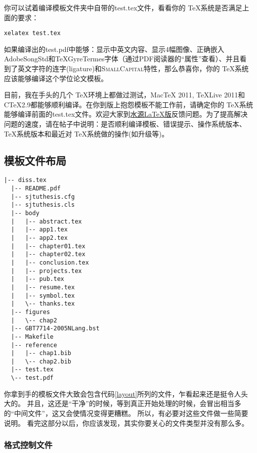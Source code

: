 你可以试着编译模板文件夹中自带的test.tex文件，看看你的 \TeX 系统是否满足上面的要求：

\begin{lstlisting}[basicstyle=\small\ttfamily, caption={编译测试文件test.tex}, numbers=none]
xelatex test.tex
\end{lstlisting}

如果编译出的test.pdf中能够：显示中英文内容、显示4幅图像、正确嵌入AdobeSongStd和TeXGyreTermes字体（通过PDF阅读器的“属性”查看）、并且看到了英文字符的连字(ligature)和\textsc{SmallCapital}特性，那么恭喜你，你的 \TeX 系统应该能够编译这个学位论文模板。

目前，我在手头的几个 \TeX 环境上都做过测试，MacTeX 2011, TeXLive 2011和C\TeX 2.9都能够顺利编译。在你到版上抱怨模板不能工作前，请确定你的 \TeX 系统能够编译前面的test.tex文件。欢迎大家到\href{https://bbs.sjtu.edu.cn/bbsdoc?board=TeX_LaTeX}{水源LaTeX版}反馈问题。为了提高解决问题的速度，请在帖子中说明：是否顺利编译模板、错误提示、操作系统版本、\TeX 系统版本和最近对 \TeX 系统做的操作(如升级等)。
 
\subsection{模板文件布局}
\label{sec:layout}

\begin{lstlisting}[basicstyle=\small\ttfamily,caption={模板文件布局},label=layout,float,numbers=none]
  |-- diss.tex
  |-- README.pdf
  |-- sjtuthesis.cfg
  |-- sjtuthesis.cls
  |-- body
  |   |-- abstract.tex
  |   |-- app1.tex
  |   |-- app2.tex
  |   |-- chapter01.tex
  |   |-- chapter02.tex
  |   |-- conclusion.tex
  |   |-- projects.tex
  |   |-- pub.tex
  |   |-- resume.tex
  |   |-- symbol.tex
  |   \-- thanks.tex
  |-- figures
  |   \-- chap2
  |-- GBT7714-2005NLang.bst
  |-- Makefile
  |-- reference
  |   |-- chap1.bib
  |   \-- chap2.bib
  |-- test.tex
  \-- test.pdf
\end{lstlisting}

你拿到手的模板文件大致会包含代码\ref{layout}所列的文件，乍看起来还是挺令人头大的。
并且，这还是“干净”的时候，等到真正开始处理的时候，会冒出相当多的“中间文件”，这又会使情况变得更糟糕。
所以，有必要对这些文件做一些简要说明。
看完这部分以后，你应该发现，其实你要关心的文件类型并没有那么多。

\subsubsection{格式控制文件}
\label{sec:format}

